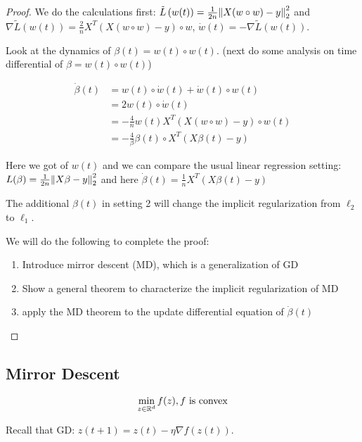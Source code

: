 \begin{proof}
    We do the calculations first: \(\tilde{L}\left( w(t) \right) = \frac{1}{2n} \norm{X(w \circ w) - y}_2^2\)
    and \\  \(\nabla \tilde{L}\left( w(t) \right) = \frac{2}{n} X^T \left(X(w \circ w) - y\right) \circ w\), 
    \(\dot{w}(t) = -\nabla \tilde{L}\left( w(t) \right)\). 

    Look at the dynamics of \(\beta(t) = w(t) \circ w(t)\). (next do some analysis on time differential of \(\beta = w(t) \circ w(t)\))

    \begin{align*}
        \dot{\beta} (t) &= w(t) \circ \dot{w}(t) + \dot{w} (t) \circ w(t) \\ 
        &= 2 w(t) \circ \dot{w}(t) \\ 
        &= - \frac{4}{n} w(t) X^T \left(X(w \circ w) - y\right) \circ w(t) \\ 
        &= - \frac{4}{\beta} \beta(t) \circ X^T \left( X \beta(t) - y \right)
    \end{align*}

    Here we got of \(w(t)\) and we can compare the usual linear regression setting: 
    \( L(\beta) = \frac{1}{2n} \norm{X\beta - y}_2^2 \) and here 
    \(\dot{\beta}(t) = \frac{1}{n} X^T \left(X\beta(t) - y\right)\)

    The additional \(\beta(t)\) in setting 2 will change the implicit regularization from \(\ell_2\)
    to \(\ell_1\). 

    We will do the following to complete the proof: 

    \begin{enumerate} 
        \item Introduce mirror descent (MD), which is a generalization of GD 
        \item Show a general theorem to characterize the implicit regularization of MD 
        \item apply the MD theorem to the update differential equation of \(\dot{\beta}(t)\) 
    \end{enumerate}
\end{proof}


\subsection{Mirror Descent}

\[
    \min_{z \in \mathbb{R}^d} f(z), f\text{ is convex}
\]


Recall that GD: \(z(t+1) = z(t) - \eta \nabla f \left(z(t) \right)\). 

